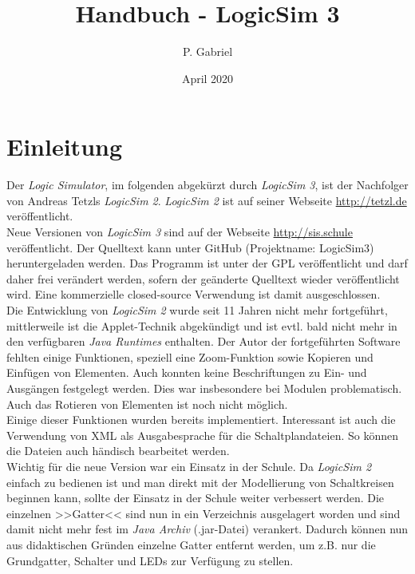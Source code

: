 \documentclass[12pt]{scrartcl}
\begin{document}
\newcommand{\lsN}{\textit{LogicSim 3}}
\newcommand{\lsA}{\textit{LogicSim 2}}


\title{Handbuch - LogicSim 3}
\author{P. Gabriel}
\date{April 2020}
\vspace*{-11mm}

\section{Einleitung}
Der \textit{Logic Simulator}, im folgenden abgekürzt durch \lsN{}, ist der Nachfolger von Andreas Tetzls \lsA{}. \lsA{} ist auf seiner Webseite \url{http://tetzl.de} veröffentlicht.\\

Neue Versionen von \lsN{} sind auf der Webseite \url{http://sis.schule} veröffentlicht. Der Quelltext kann unter GitHub (Projektname: LogicSim3) heruntergeladen werden. Das Programm ist unter der GPL veröffentlicht und darf daher frei verändert werden, sofern der geänderte Quelltext wieder veröffentlicht wird. Eine kommerzielle closed-source Verwendung ist damit ausgeschlossen.\\

Die Entwicklung von \lsA{} wurde seit 11 Jahren nicht mehr fortgeführt, mittlerweile ist die Applet-Technik abgekündigt und ist evtl. bald nicht mehr in den verfügbaren \textit{Java Runtimes} enthalten. Der Autor der fortgeführten Software fehlten einige Funktionen, speziell eine Zoom-Funktion sowie Kopieren und Einfügen von Elementen. Auch konnten keine Beschriftungen zu Ein- und Ausgängen festgelegt werden. Dies war insbesondere bei Modulen problematisch. Auch das Rotieren von Elementen ist noch nicht möglich.\\

Einige dieser Funktionen wurden bereits implementiert. Interessant ist auch die Verwendung von XML als Ausgabesprache für die Schaltplandateien. So können die Dateien auch händisch bearbeitet werden.\\

Wichtig für die neue Version war ein Einsatz in der Schule. Da \lsA{} einfach zu bedienen ist und man direkt mit der Modellierung von Schaltkreisen beginnen kann, sollte der Einsatz in der Schule weiter verbessert werden. Die einzelnen >>Gatter<< sind nun in ein Verzeichnis ausgelagert worden und sind damit nicht mehr fest im \textit{Java Archiv} (.jar-Datei) verankert. Dadurch können nun aus didaktischen Gründen einzelne Gatter entfernt werden, um z.B. nur die Grundgatter, Schalter und LEDs zur Verfügung zu stellen.\\
\end{document}
